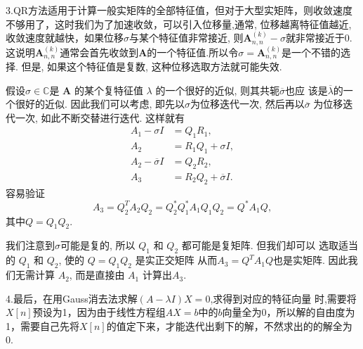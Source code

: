 3.QR方法适用于计算一般实矩阵的全部特征值，但对于大型实矩阵，则收敛速度不够用了，这时我们为了加速收敛，可以引入位移量,通常, 位移越离特征值越近,收敛速度就越快，如果位移$\sigma$与某个特征值非常接近, 则$\bm{A}_{n,n}^{(k)}-\sigma$就非常接近于0.
这说明$\bm{A}_{n,n}^{(k)}$通常会首先收敛到$\bm{A}$的一个特征值.所以令$\sigma=\bm{A}_{n,n}^{(k)}$是一个不错的选择.
但是, 如果这个特征值是复数, 这种位移选取方法就可能失效.

假设$\sigma \in \mathbb{C}$是 $\bm{A}$ 的某个复特征值 $\lambda$ 的一个很好的近似, 则其共轭$\overline{\sigma}$也应
该是$\overline{\lambda}$的一个很好的近似. 因此我们可以考虑, 即先以$\sigma$为位移迭代一次, 然后再以$\overline{\sigma}$ 为位移迭代一次, 如此不断交替进行迭代.
这样就有
\begin{align*}
A_1-\sigma I&=Q_1R_1, \\
A_2&=R_1Q_1+\sigma I,\\
A_2-\overline{\sigma}I&=Q_2R_2, \\
A_3&=R_2Q_2+\overline{\sigma}I.
\end{align*}
容易验证
\[A_3=Q_2^TA_2Q_2=Q_2^{\ast}Q_1^{\ast}A_1Q_1Q_2=Q^{\ast}A_1Q,
\]
其中$Q=Q_1Q_2$.

我们注意到$\sigma$可能是复的, 所以 $Q_1$ 和 $Q_2$ 都可能是复矩阵. 但我们却可以
选取适当的 $Q_1$ 和 $Q_2$, 使的 $Q=Q_1Q_2$ 是实正交矩阵
从而$A_3 = Q^T A_1Q $也是实矩阵. 因此我们无需计算 $A_2$, 而是直接由 $A_1$ 计算出$A_3$.

4.最后，在用Gauss消去法求解$(A-\lambda I)X=0$,求得到对应的特征向量
时,需要将$X[n]$预设为1，因为由于线性方程组$AX=b$中的$b$向量全为0，所以解的自由度为1，需要自己先将$X[n]$的值定下来，才能迭代出剩下的解，不然求出的的解全为0.

